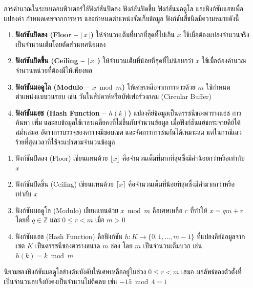 การคำนวณในระบบคอมพิวเตอร์ใช้ฟังก์ชันปัดลง ฟังก์ชันปัดขึ้น ฟังก์ชันมอดูโล และฟังก์ชันแฮชเพื่อแปลงค่า กำหนดเศษจากการหาร และกำหนดตำแหน่งจัดเก็บข้อมูล ฟังก์ชันสี่ชนิดมีความหมายดังนี้~\parencite{johnsonbaugh2016discrete}
\begin{enumerate}[label=\textbf{\arabic*.}]
    \item \textbf{ฟังก์ชันปัดลง (Floor -- $\lfloor x \rfloor$)} ให้จำนวนเต็มที่มากที่สุดที่ไม่เกิน $x$ ใช้เมื่อต้องแปลงจำนวนจริงเป็นจำนวนเต็มโดยตัดส่วนทศนิยมลง
    \item \textbf{ฟังก์ชันปัดขึ้น (Ceiling -- $\lceil x \rceil$)} ให้จำนวนเต็มที่น้อยที่สุดที่ไม่น้อยกว่า $x$ ใช้เมื่อต้องคำนวณจำนวนหน่วยที่ต้องมีให้เพียงพอ
    \item \textbf{ฟังก์ชันมอดูโล (Modulo -- $x \bmod m$)} ให้เศษเหลือจากการหารด้วย $m$ ใช้กำหนดตำแหน่งแบบวนรอบ เช่น วันในสัปดาห์หรือบัฟเฟอร์วงกลม (Circular Buffer)
    \item \textbf{ฟังก์ชันแฮช (Hash Function -- $h(k)$)} แปลงคีย์ข้อมูลเป็นดรรชนีของตารางแฮช การค้นหา เพิ่ม และลบข้อมูลใช้เวลาเฉลี่ยคงที่ไม่ขึ้นกับจำนวนข้อมูล เมื่อฟังก์ชันแฮชกระจายคีย์ได้สม่ำเสมอ อัตราการบรรจุของตารางมีขอบเขต และจัดการการชนกันได้เหมาะสม แต่ในกรณีเลวร้ายที่สุดเวลาที่ใช้จะแปรตามจำนวนข้อมูล
\end{enumerate}

\begin{definition}[ฟังก์ชันพิเศษ]
\begin{enumerate}[label=\textbf{\arabic*.}]
    \item ฟังก์ชันปัดลง (Floor) เขียนแทนด้วย $\lfloor x \rfloor$ คือจำนวนเต็มที่มากที่สุดซึ่งมีค่าน้อยกว่าหรือเท่ากับ $x$
    \item ฟังก์ชันปัดขึ้น (Ceiling) เขียนแทนด้วย $\lceil x \rceil$ คือจำนวนเต็มที่น้อยที่สุดซึ่งมีค่ามากกว่าหรือเท่ากับ $x$
    \item ฟังก์ชันมอดูโล (Modulo) เขียนแทนด้วย $x \bmod m$ คือเศษเหลือ $r$ ที่ทำให้ $x = qm + r$ โดยที่ $q \in \mathbb{Z}$ และ $0 \le r < m$ เมื่อ $m > 0$
    \item ฟังก์ชันแฮช (Hash Function) คือฟังก์ชัน $h: K \to \{0,1,\ldots,m-1\}$ ที่แปลงคีย์ข้อมูลจากเซต $K$ เป็นดรรชนีของตารางขนาด $m$ ช่อง โดย $m$ เป็นจำนวนเต็มบวก เช่น $h(k) = k \bmod m$
\end{enumerate}
\end{definition}

นิยามของฟังก์ชันมอดูโลข้างต้นบังคับให้เศษเหลืออยู่ในช่วง $0 \le r < m$ เสมอ ผลลัพธ์ของตัวตั้งที่เป็นจำนวนลบจึงยังคงเป็นจำนวนไม่ติดลบ เช่น $-15 \bmod 4 = 1$

